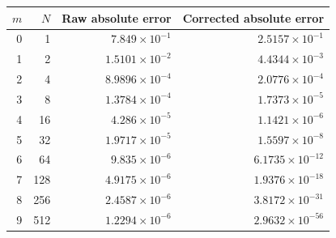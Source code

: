 \begin{tabular}{rrrr}
\toprule
$m$ & $N$ & Raw absolute error & Corrected absolute error \\
\midrule
0 & 1 & \(7.849\times10^{-1}\) & \(2.5157\times10^{-1}\) \\
1 & 2 & \(1.5101\times10^{-2}\) & \(4.4344\times10^{-3}\) \\
2 & 4 & \(8.9896\times10^{-4}\) & \(2.0776\times10^{-4}\) \\
3 & 8 & \(1.3784\times10^{-4}\) & \(1.7373\times10^{-5}\) \\
4 & 16 & \(4.286\times10^{-5}\) & \(1.1421\times10^{-6}\) \\
5 & 32 & \(1.9717\times10^{-5}\) & \(1.5597\times10^{-8}\) \\
6 & 64 & \(9.835\times10^{-6}\) & \(6.1735\times10^{-12}\) \\
7 & 128 & \(4.9175\times10^{-6}\) & \(1.9376\times10^{-18}\) \\
8 & 256 & \(2.4587\times10^{-6}\) & \(3.8172\times10^{-31}\) \\
9 & 512 & \(1.2294\times10^{-6}\) & \(2.9632\times10^{-56}\) \\
\bottomrule
\end{tabular}
